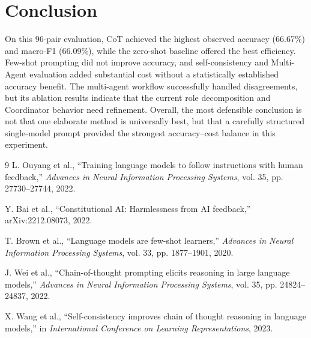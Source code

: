 \documentclass[10pt]{article}
\begin{document}
\section{Conclusion}
On this 96-pair evaluation, CoT achieved the highest observed accuracy (66.67\%) and macro-F1 (66.09\%), while the zero-shot baseline offered the best efficiency. Few-shot prompting did not improve accuracy, and self-consistency and Multi-Agent evaluation added substantial cost without a statistically established accuracy benefit. The multi-agent workflow successfully handled disagreements, but its ablation results indicate that the current role decomposition and Coordinator behavior need refinement. Overall, the most defensible conclusion is not that one elaborate method is universally best, but that a carefully structured single-model prompt provided the strongest accuracy--cost balance in this experiment.

\enlargethispage{3\baselineskip}
\small
\begin{thebibliography}{9}
L. Ouyang et al., ``Training language models to follow instructions with human feedback,'' \emph{Advances in Neural Information Processing Systems}, vol. 35, pp. 27730--27744, 2022.

Y. Bai et al., ``Constitutional AI: Harmlessness from AI feedback,'' arXiv:2212.08073, 2022.

T. Brown et al., ``Language models are few-shot learners,'' \emph{Advances in Neural Information Processing Systems}, vol. 33, pp. 1877--1901, 2020.

J. Wei et al., ``Chain-of-thought prompting elicits reasoning in large language models,'' \emph{Advances in Neural Information Processing Systems}, vol. 35, pp. 24824--24837, 2022.

X. Wang et al., ``Self-consistency improves chain of thought reasoning in language models,'' in \emph{International Conference on Learning Representations}, 2023.
\end{thebibliography}
\end{document}
